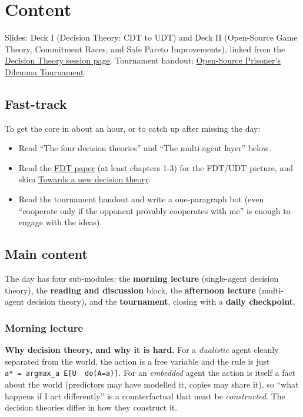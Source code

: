 \documentclass[11pt]{article}
\begin{document}
\section{Content}
Slides: Deck I (Decision Theory: CDT to UDT) and Deck II (Open-Source Game Theory, Commitment Races, and Safe Pareto Improvements), linked from the \href{https://iliad.au.pe/sessions/decision-theory/participant-guide.html}{Decision Theory session page}. Tournament handout: \href{https://iliad.au.pe/sessions/decision-theory/handout.html}{Open-Source Prisoner's Dilemma Tournament}.

\subsection{Fast-track}
To get the core in about an hour, or to catch up after missing the day:

\begin{itemize}
\item
  Read ``The four decision theories'' and ``The multi-agent layer'' below.
\item
  Read the \href{https://arxiv.org/abs/1710.05060}{FDT paper} (at least chapters 1-3) for the FDT/UDT picture, and skim \href{https://www.lesswrong.com/posts/de3xjFaACCAk6imzv/towards-a-new-decision-theory}{Towards a new decision theory}.
\item
  Read the tournament handout and write a one-paragraph bot (even ``cooperate only if the opponent provably cooperates with me'' is enough to engage with the ideas).
\end{itemize}

\subsection{Main content}
The day has four sub-modules: the \textbf{morning lecture} (single-agent decision theory), the \textbf{reading and discussion} block, the \textbf{afternoon lecture} (multi-agent decision theory), and the \textbf{tournament}, closing with a \textbf{daily checkpoint}.

\subsubsection{Morning lecture}
\textbf{Why decision theory, and why it is hard.} For a \emph{dualistic} agent cleanly separated from the world, the action is a free variable and the rule is just \texttt{a*\ =\ argmax\_a\ E{[}U\ \textbar{}\ do(A=a){]}}. For an \emph{embedded} agent the action is itself a fact about the world (predictors may have modelled it, copies may share it), so ``what happens if I act differently'' is a counterfactual that must be \emph{constructed}. The decision theories differ in how they construct it.
\end{document}
